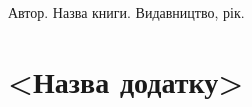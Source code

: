 \documentclass[14pt]{extreport}
\begin{document}
  \renewcommand\bibname{\MakeUppercase{Список літератури}}
  \begin{thebibliography}{99}
     Автор. Назва книги. Видавництво, рік.
  \end{thebibliography}
  
  \appendix
  \renewcommand{\thechapter}{\Alph{chapter}}
  \renewcommand{\chaptername}{Додаток}
  
  \chapter{<Назва додатку>}
  
\end{document}
